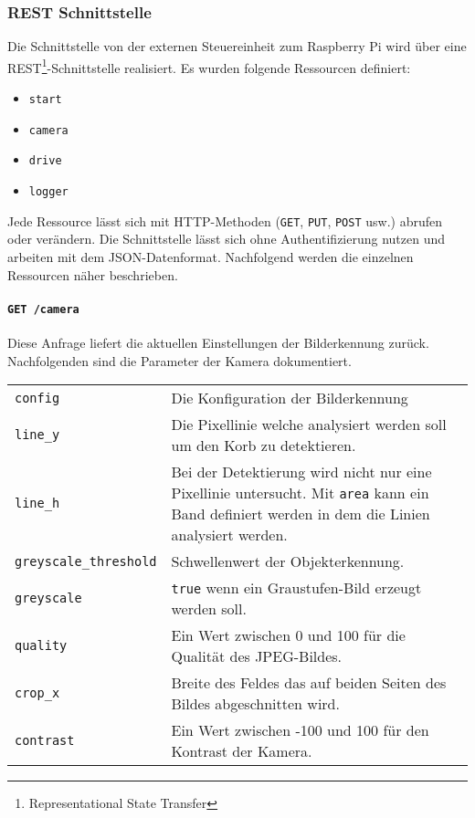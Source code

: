 \subsubsection{REST Schnittstelle}
\label{sec:rest-schnittstelle}

Die Schnittstelle von der externen Steuereinheit zum Raspberry Pi wird über eine REST\footnote{Representational State Transfer}-Schnittstelle realisiert. Es wurden folgende Ressourcen definiert:
\begin{itemize}
	\item \texttt{start}
	\item \texttt{camera}
	\item \texttt{drive}
	\item \texttt{logger}
\end{itemize}
Jede Ressource lässt sich mit HTTP-Methoden (\texttt{GET}, \texttt{PUT}, \texttt{POST} usw.) abrufen oder verändern. Die Schnittstelle lässt sich ohne Authentifizierung nutzen und arbeiten mit dem JSON-Datenformat. Nachfolgend werden die einzelnen Ressourcen näher beschrieben.

\paragraph{\texttt{GET /camera}}

Diese Anfrage liefert die aktuellen Einstellungen der Bilderkennung zurück. Nachfolgenden sind die Parameter der Kamera dokumentiert.

\begin{table}[h!]
	\begin{tabular}{l p{16cm}}
		\texttt{config} & Die Konfiguration der Bilderkennung \\
		\texttt{line\_y} & Die Pixellinie welche analysiert werden soll um den Korb zu detektieren. \\
		\texttt{line\_h} & Bei der Detektierung wird nicht nur eine Pixellinie untersucht. Mit \texttt{area} kann ein Band definiert werden in dem die Linien analysiert werden. \\
		\texttt{greyscale\_threshold} & Schwellenwert der Objekterkennung. \\
		\texttt{greyscale} & \texttt{true} wenn ein Graustufen-Bild erzeugt werden soll. \\
		\texttt{quality} & Ein Wert zwischen 0 und 100 für die Qualität des JPEG-Bildes. \\
		\texttt{crop\_x} & Breite des Feldes das auf beiden Seiten des Bildes abgeschnitten wird. \\
		\texttt{contrast} & Ein Wert zwischen -100 und 100 für den Kontrast der Kamera. \\
	\end{tabular}
\end{table}

